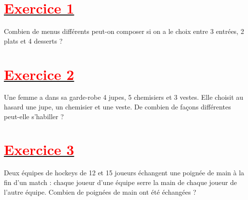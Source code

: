 \documentclass[12pt,a4paper]{article}
\begin{document}
\renewcommand{\arraystretch}{1.5}
\renewcommand{\arrayrulewidth}{1.2pt}
\vspace{3cm}
\section*{\underline{\textbf{\textcolor{red}{Exercice 1}}}}
Combien de menus différents peut-on composer si on a le choix entre 3 entrées, 2 plats et 4 desserts ?
\section*{\underline{\textbf{\textcolor{red}{Exercice 2}}}}
Une femme a dans sa garde-robe 4 jupes, 5 chemisiers et 3 vestes. Elle choisit au hasard une jupe, un chemisier et une veste. De combien de façons différentes peut-elle s’habiller ?
\section*{\underline{\textbf{\textcolor{red}{Exercice 3}}}}
Deux équipes de hockeys de 12 et 15 joueurs échangent une poignée de main à la fin d’un match : chaque joueur d’une équipe serre la main de chaque joueur de l’autre équipe. Combien de poignées de main ont été échangées ?
\end{document}
